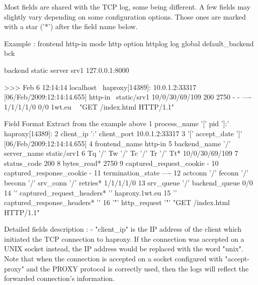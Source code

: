 Most fields are shared with the TCP log, some being different. A few fields may
slightly vary depending on some configuration options. Those ones are marked
with a star ('*') after the field name below.

  Example :
        frontend http-in
            mode http
            option httplog
            log global
            default_backend bck

        backend static
            server srv1 127.0.0.1:8000

    >>> Feb  6 12:14:14 localhost \
          haproxy[14389]: 10.0.1.2:33317 [06/Feb/2009:12:14:14.655] http-in \
          static/srv1 10/0/30/69/109 200 2750 - - ---- 1/1/1/1/0 0/0 {1wt.eu} \
          {} "GET /index.html HTTP/1.1"

  Field   Format                                Extract from the example above
      1   process_name '[' pid ']:'                            haproxy[14389]:
      2   client_ip ':' client_port                             10.0.1.2:33317
      3   '[' accept_date ']'                       [06/Feb/2009:12:14:14.655]
      4   frontend_name                                                http-in
      5   backend_name '/' server_name                             static/srv1
      6   Tq '/' Tw '/' Tc '/' Tr '/' Tt*                       10/0/30/69/109
      7   status_code                                                      200
      8   bytes_read*                                                     2750
      9   captured_request_cookie                                            -
     10   captured_response_cookie                                           -
     11   termination_state                                               ----
     12   actconn '/' feconn '/' beconn '/' srv_conn '/' retries*    1/1/1/1/0
     13   srv_queue '/' backend_queue                                      0/0
     14   '{' captured_request_headers* '}'                   {haproxy.1wt.eu}
     15   '{' captured_response_headers* '}'                                {}
     16   '"' http_request '"'                      "GET /index.html HTTP/1.1"


Detailed fields description :
  - "client_ip" is the IP address of the client which initiated the TCP
    connection to haproxy. If the connection was accepted on a UNIX socket
    instead, the IP address would be replaced with the word "unix". Note that
    when the connection is accepted on a socket configured with "accept-proxy"
    and the PROXY protocol is correctly used, then the logs will reflect the
    forwarded connection's information.

